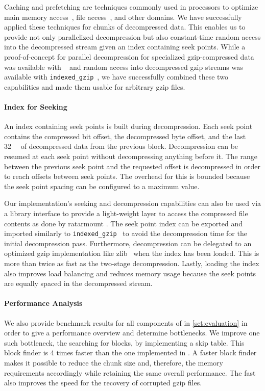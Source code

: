 Caching and prefetching are techniques commonly used in processors to optimize main memory access~\cite{smith1982cache}, file access~\cite{mpi-io-caching}, and other domains.
We have successfully applied these techniques for chunks of decompressed data.
This enables us to provide not only parallelized decompression but also constant-time random access into the decompressed stream given an index containing seek points.
While a proof-of-concept for parallel decompression for specialized gzip-compressed data was available with \pugz~\cite{pugz} and random access into decompressed gzip streams was available with \texttt{indexed\_gzip}~\cite{indexed_gzip}, we have successfully combined these two capabilities and made them usable for arbitrary gzip files.

\paragraph{Index for Seeking}
An index containing seek points is built during decompression.
Each seek point contains the compressed bit offset, the decompressed byte offset, and the last \SI{32}{\kibi\byte} of decompressed data from the previous block.
Decompression can be resumed at each seek point without decompressing anything before it.
The range between the previous seek point and the requested offset is decompressed in order to reach offsets between seek points.
The overhead for this is bounded because the seek point spacing can be configured to a maximum value.

Our implementation's seeking and decompression capabilities can also be used via a library interface to provide a light-weight layer to access the compressed file contents as done by ratar\-mount \cite{ratarmount}.
The seek point index can be exported and imported similarly to \texttt{indexed\_gzip}~\cite{indexed_gzip} to avoid the decompression time for the initial decompression pass.
Furthermore, decompression can be delegated to an optimized gzip implementation like zlib~\cite{zlib} when the index has been loaded.
This is more than twice as fast as the two-stage decompression.
Lastly, loading the index also improves load balancing and reduces memory usage because the seek points are equally spaced in the decompressed stream.

\paragraph{Performance Analysis}

We also provide benchmark results for all components of \pragzipname in \cref{sct:evaluation} in order to give a performance overview and determine bottlenecks.
We improve one such bottleneck, the searching for  blocks, by implementing a skip table.
This block finder is 4 times faster than the one implemented in \pugz.
A faster block finder makes it possible to reduce the chunk size and, therefore, the memory requirements accordingly while retaining the same overall performance.
The fast  \blockfinder also improves the speed for the recovery of corrupted gzip files.


